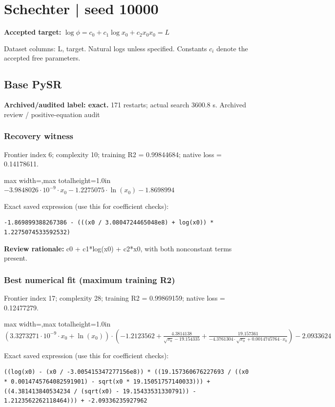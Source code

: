 \documentclass[10pt,letterpaper,landscape]{article}
\begin{document}
\section*{Schechter | seed 10000}
\textbf{Accepted target:} $\displaystyle \log\phi=c_0+c_1\log x_0+c_2x_0$\hfill $x_0=L$\par
{\small Dataset columns: L, target. Natural logs unless specified. Constants $c_i$ denote the accepted free parameters.}\par\medskip
\begin{minipage}[t]{0.485\textwidth}
\subsection*{Base PySR}
\textbf{Archived/audited label: exact.} 171 restarts; actual search 3600.8 s.
{\small Archived review / positive-equation audit}
\subsubsection*{Recovery witness}
Frontier index 6; complexity 10; training R2 = 0.99844684; native loss = 0.14178611.
\begin{center}\begin{adjustbox}{max width=\linewidth,max totalheight=1.0in}$\displaystyle - 3.9848026 \cdot 10^{-9} \cdot x_{0} - 1.2275075 \cdot \ln{\left(x_{0} \right)} - 1.8698994$\end{adjustbox}\end{center}
{\scriptsize Exact saved expression (use this for coefficient checks):}
\begin{lstlisting}
-1.869899388267386 - (((x0 / 3.0804724465048e8) + log(x0)) * 1.2275074533592532)
\end{lstlisting}
{\small\textbf{Review rationale:} c0 + c1*log(x0) + c2*x0, with both nonconstant terms present.}
\subsubsection*{Best numerical fit (maximum training R2)}
Frontier index 17; complexity 28; training R2 = 0.99869159; native loss = 0.12477279.
\begin{center}\begin{adjustbox}{max width=\linewidth,max totalheight=1.0in}$\displaystyle \left(3.3273271 \cdot 10^{-9} \cdot x_{0} + \ln{\left(x_{0} \right)}\right) \cdot \left(-1.2123562 + \frac{4.3814138}{\sqrt{x_{0}} - 19.154335} + \frac{19.157361}{- 4.3761304 \cdot \sqrt{x_{0}} + 0.0014745764 \cdot x_{0}}\right) - 2.0933624$\end{adjustbox}\end{center}
{\scriptsize Exact saved expression (use this for coefficient checks):}
\begin{lstlisting}
((log(x0) - (x0 / -3.005415347277156e8)) * ((19.157360676227693 / ((x0 * 0.0014745764082591901) - sqrt(x0 * 19.15051757140033))) + ((4.381413840534234 / (sqrt(x0) - 19.15433531330791)) - 1.2123562262118464))) + -2.09336235927962
\end{lstlisting}
\end{minipage}\hfill
\end{document}
